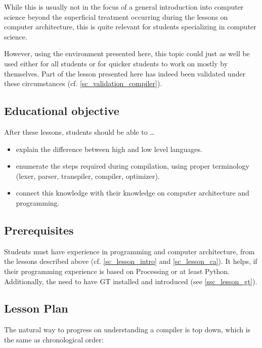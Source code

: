 While this is usually not in the focus of a general introduction into computer science beyond the superficial treatment occurring during the lessons on computer architecture, this is quite relevant for students specializing in computer science.

However, using the environment presented here, this topic could just as well be used either for all students or for quicker students to work on mostly by themselves. Part of the lesson presented here has indeed been validated under these circumstances (cf. \ref{sc_validation_compiler}).


\subsection{Educational objective}

After these lessons, students should be able to \dots
\begin{itemize}
\item explain the difference between high and low level languages.
\item enumerate the steps required during compilation, using proper terminology (lexer, parser, transpiler, compiler, optimizer).
\item connect this knowledge with their knowledge on computer architecture and programming.
\end{itemize}


\subsection{Prerequisites}

Students must have experience in programming and computer architecture, \eg from the lessons described above (cf. \ref{sc_lesson_intro} and \ref{sc_lesson_ca}). It helps, if their programming experience is based on Processing or at least Python. Additionally, the need to have \ac{GT} installed and introduced (see \ref{ssc_lesson_gt}).


\subsection{Lesson Plan}

The natural way to progress on understanding a compiler is top down, which is the same as chronological order:


